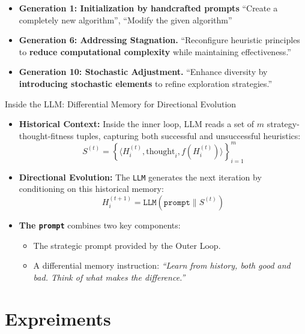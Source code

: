 \documentclass{beamer}
\begin{document}
\begin{frame}
	\begin{itemize}
		\item \textbf{Generation 1: Initialization by handcrafted prompts}   ``Create a completely new algorithm'', ``Modify the given algorithm'' 
		
		\item \textbf{Generation 6: Addressing Stagnation.} ``Reconfigure heuristic principles to \textbf{reduce computational complexity} while maintaining effectiveness.'' 

		
		\item \textbf{Generation 10: Stochastic Adjustment.}  ``Enhance diversity by \textbf{introducing stochastic elements} to refine exploration strategies.'' 

 
	\end{itemize}
\end{frame}
\begin{frame}{Inside the LLM: Differential Memory for Directional Evolution}
	\begin{itemize}
		\item \textbf{Historical Context:} Inside the inner loop, LLM reads a set of $m$ strategy-thought-fitness tuples, capturing both successful and unsuccessful heuristics:
		$$S^{(t)} = \left\{ \langle H_i^{(t)}, \text{thought}_i, f(H_i^{(t)}) \rangle \right\}_{i=1}^m$$
		
		\item \textbf{Directional Evolution:} The \texttt{LLM} generates the next iteration by conditioning on this historical memory:
		$$H_i^{(t+1)} = \texttt{LLM}( \texttt{prompt} \parallel S^{(t)})$$
		
		\item \textbf{The  \texttt{prompt}} combines two key components:
		\begin{itemize}
			\item[--] The strategic prompt provided by the Outer Loop.
			\item[--] A differential memory instruction: \textit{``Learn from history, both good and bad. Think of what makes the difference.''}
		\end{itemize}
	\end{itemize}
\end{frame}
	
	\section{Expreiments}
	
\end{document}
